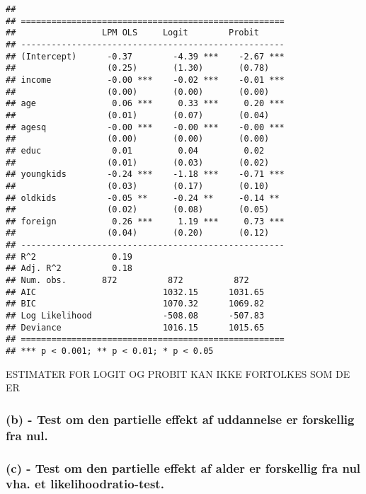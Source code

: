 \documentclass[
]{article}
\begin{document}
\begin{verbatim}
## 
## ====================================================
##                 LPM OLS     Logit        Probit     
## ----------------------------------------------------
## (Intercept)      -0.37        -4.39 ***    -2.67 ***
##                  (0.25)       (1.30)       (0.78)   
## income           -0.00 ***    -0.02 ***    -0.01 ***
##                  (0.00)       (0.00)       (0.00)   
## age               0.06 ***     0.33 ***     0.20 ***
##                  (0.01)       (0.07)       (0.04)   
## agesq            -0.00 ***    -0.00 ***    -0.00 ***
##                  (0.00)       (0.00)       (0.00)   
## educ              0.01         0.04         0.02    
##                  (0.01)       (0.03)       (0.02)   
## youngkids        -0.24 ***    -1.18 ***    -0.71 ***
##                  (0.03)       (0.17)       (0.10)   
## oldkids          -0.05 **     -0.24 **     -0.14 ** 
##                  (0.02)       (0.08)       (0.05)   
## foreign           0.26 ***     1.19 ***     0.73 ***
##                  (0.04)       (0.20)       (0.12)   
## ----------------------------------------------------
## R^2               0.19                              
## Adj. R^2          0.18                              
## Num. obs.       872          872          872       
## AIC                         1032.15      1031.65    
## BIC                         1070.32      1069.82    
## Log Likelihood              -508.08      -507.83    
## Deviance                    1016.15      1015.65    
## ====================================================
## *** p < 0.001; ** p < 0.01; * p < 0.05
\end{verbatim}

ESTIMATER FOR LOGIT OG PROBIT KAN IKKE FORTOLKES SOM DE ER

\hypertarget{b---test-om-den-partielle-effekt-af-uddannelse-er-forskellig-fra-nul.-1}{%
\subsubsection{(b) - Test om den partielle effekt af uddannelse er
forskellig fra
nul.}\label{b---test-om-den-partielle-effekt-af-uddannelse-er-forskellig-fra-nul.-1}}

\hypertarget{c---test-om-den-partielle-effekt-af-alder-er-forskellig-fra-nul-vha.-et-likelihoodratio-test.}{%
\subsubsection{(c) - Test om den partielle effekt af alder er forskellig
fra nul vha. et
likelihoodratio-test.}\label{c---test-om-den-partielle-effekt-af-alder-er-forskellig-fra-nul-vha.-et-likelihoodratio-test.}}
\end{document}
